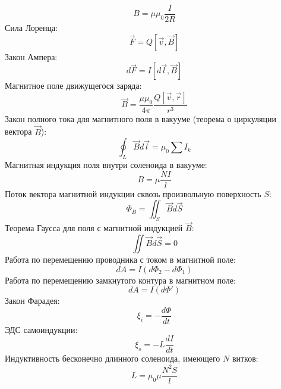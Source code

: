 \documentclass[twoside, a4paperpt, fleqn]{extarticle}
\begin{document}
\begin{equation*}
    B = \mu \mu_0 \frac{I} {2 R}
\end{equation*}
Сила Лоренца:
\begin{equation*}
    \vec{F} = Q [\vec{v}, \vec{B}]
\end{equation*}
Закон Ампера:
\begin{equation*}
    d \vec{F} = I [d \vec{l}, \vec{B}]
\end{equation*}
Магнитное поле движущегося заряда:
\begin{equation*}
    \vec{B} = \frac{\mu \mu_0}{4 \pi} \frac{Q [\vec{v}, \vec{r}]}{r^3}
\end{equation*}
Закон полного тока для магнитного поля в вакууме (теорема о циркуляции вектора $\vec{B}$):
\begin{equation*}
    \oint_L \vec{B} d \vec{l} = \mu_0 \sum I_k
\end{equation*}
Магнитная индукция поля внутри соленоида в вакууме:
\begin{equation*}
    B = \mu \frac{N I}{l}
\end{equation*}
Поток вектора магнитной индукции сквозь произвольную поверхность $S$:
\begin{equation*}
    \Phi_B = \iint_S \vec{B}{d \vec{S}}
\end{equation*}
Теорема Гаусса для поля с магнитной индукцией $\vec{B}$:
\begin{equation*}
    \iint \vec{B} d \vec{S} = 0
\end{equation*}
Работа по перемещению проводника с током в магнитной поле:
\begin{equation*}
    d A = I(d \Phi_2 - d \Phi_1)
\end{equation*}
Работа по перемещению замкнутого контура в магнитном поле:
\begin{equation*}
    d A = I(d \Phi')
\end{equation*}
Закон Фарадея:
\begin{equation*}
    \xi_i = - \frac{d \Phi}{d t}
\end{equation*}
ЭДС самоиндукции:
\begin{equation*}
    \xi_s = - L \frac{d I}{d t}
\end{equation*}
Индуктивность бесконечно длинного соленоида, имеющего $N$ витков:
\begin{equation*}
    L = \mu_0 \mu \frac{N^2 S}{l}
\end{equation*}
\end{document}
